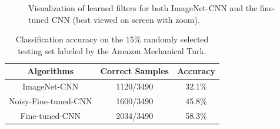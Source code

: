 \documentclass[letterpaper]{article}
\begin{document}
\begin{figure}[!t]
\begin{center}
\end{center}
\caption{Visualization of learned filters for both ImageNet-CNN and the fine-tuned CNN (best viewed on screen with zoom).}
\label{fig:embedding}
\end{figure}

\begin{table}[!htpb]
\begin{center}
\begin{tabular}{*{3}{|c}|}
\hline
Algorithms & Correct Samples & Accuracy \\
\hline\hline
ImageNet-CNN & 1120/3490 & 32.1\% \\
Noisy-Fine-tuned-CNN & 1600/3490 & 45.8\% \\
Fine-tuned-CNN & 2034/3490 & 58.3\% \\
\hline
\end{tabular}
\end{center}
\caption{Classification accuracy on the $15\%$ randomly selected testing set labeled by the Amazon Mechanical Turk.}
\label{tab:testing:acc}
\end{table}
\end{document}
